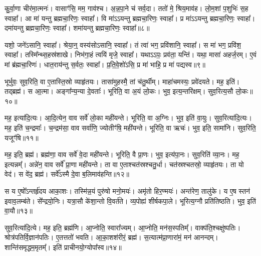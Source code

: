 कु॒र्वा॒णा चीर॑मा॒त्मनः॑। 
वासाꣳ॑सि॒ मम॒ गाव॑श्च। 
अ॒न्न॒पा॒ने च॑ सर्व॒दा। 
ततो॑ मे॒ श्रिय॒माव॑ह। 
लो॒म॒शां प॒शुभिः॑ स॒ह स्वाहा᳚। 
आ मा॑ यन्तु ब्रह्मचा॒रिणः॒ स्वाहा᳚। 
वि मा॑ऽऽयन्तु ब्रह्मचा॒रिणः॒ स्वाहा᳚। 
प्र मा॑ऽऽयन्तु ब्रह्मचा॒रिणः॒ स्वाहा᳚। 
दमा॑यन्तु ब्रह्मचा॒रिणः॒ स्वाहा᳚। 
शमा॑यन्तु ब्रह्मचा॒रिणः॒ स्वाहा᳚॥८॥

यशो॒ जने॑ऽसानि॒ स्वाहा᳚। 
श्रेया॒न्॒ वस्य॑सोऽसानि॒ स्वाहा᳚। 
तं त्वा॑ भग॒ प्रवि॑शानि॒ स्वाहा᳚। 
स मा॑ भग॒ प्रवि॑श॒ स्वाहा᳚। 
तस्मि᳚न्थ्स॒हस्र॑शाखे। 
निभ॑गा॒हं त्वयि॑ मृजे॒ स्वाहा᳚। 
यथाऽऽपः॒ प्रव॑ता॒ यन्ति॑। 
यथा॒ मासा॑ अहर्ज॒रम्। 
ए॒वं मां ब्र॑ह्मचा॒रिणः॑। 
धात॒राय॑न्तु स॒र्वतः॒ स्वाहा᳚। 
प्र॒ति॒वे॒शो॑ऽसि॒ प्र मा॑ भाहि॒ प्र मा॑ पद्यस्व॥९॥
\anuvakamend%

भूर्भुवः॒ सुव॒रिति॒ वा ए॒तास्ति॒स्रो व्याहृ॑तयः। 
तासा॑मुहस्मै॒ तां च॑तु॒र्थीम्। 
माहा॑चमस्यः॒ प्रवे॑दयते। 
मह॒ इति॑। 
तद्ब्रह्म॑। 
स आ॒त्मा। 
अङ्गा᳚न्य॒न्या दे॒वताः᳚। 
भूरिति॒ वा अ॒यं लो॒कः। 
भुव॒ इत्य॒न्तरि॑क्षम्। 
सुव॒रित्य॒सौ लो॒कः॥१०॥

मह॒ इत्या॑दि॒त्यः। 
आ॒दि॒त्येन॒ वाव सर्वे॑ लो॒का मही॑यन्ते। 
भूरिति॒ वा अ॒ग्निः। 
भुव॒ इति॑ वा॒युः। 
सुव॒रित्या॑दि॒त्यः। 
मह॒ इति॑ च॒न्द्रमाः᳚। 
च॒न्द्रम॑सा॒ वाव सर्वा॑णि॒ ज्योतीꣳ॑षि॒ मही॑यन्ते। 
भूरिति॒ वा ऋचः॑। 
भुव॒ इति॒ सामा॑नि। 
सुव॒रिति॒ यजूꣳ॑षि॥११॥

मह॒ इति॒ ब्रह्म॑। 
ब्रह्म॑णा॒ वाव सर्वे॑ वे॒दा मही॑यन्ते। 
भूरिति॒ वै प्रा॒णः। 
भुव॒ इत्य॑पा॒नः। 
सुव॒रिति॑ व्या॒नः। 
मह॒ इत्यन्नम्᳚। 
अन्ने॑न॒ वाव सर्वे᳚ प्रा॒णा मही॑यन्ते। 
ता वा ए॒ताश्चत॑स्रश्चतु॒र्धा। 
चत॑स्रश्चतस्रो॒ व्याहृ॑तयः। 
ता यो वेद॑। 
स वे॑द॒ ब्रह्म॑। 
सर्वे᳚ऽस्मै दे॒वा ब॒लिमाव॑हन्ति॥१२॥
\anuvakamend[अ॒सौ लो॒को यजूꣳ॑षि॒ वेद॒ द्वे च॑]

स य ए॒षो᳚ऽन्तर्\mbox{}हृ॑दय आका॒शः। 
तस्मि॑न्न॒यं पुरु॑षो मनो॒मयः॑। 
अमृ॑तो हिर॒ण्मयः॑। 
अन्त॑रेण॒ तालु॑के। 
य ए॒ष स्तन॑ इवाव॒\-लम्ब॑ते। 
से᳚न्द्रयो॒निः। 
यत्रा॒सौ के॑शा॒न्तो वि॒वर्त॑ते। 
व्य॒पोह्य॑ शीर्\mbox{}षकपा॒ले। 
भूरित्य॒ग्नौ प्रति॑\-तिष्ठति। 
भुव॒ इति॑ वा॒यौ॥१३॥

सुव॒रित्या॑दि॒त्ये। 
मह॒ इति॒ ब्रह्म॑णि। 
आ॒प्नोति॒ स्वारा᳚ज्यम्। 
आ॒प्नोति॒ मन॑स॒स्पतिम्᳚। 
वाक्प॑ति॒श्चक्षु॑ष्पतिः। 
श्रोत्र॑पतिर्वि॒\-ज्ञान॑पतिः। 
ए॒तत्ततो॑ भवति। 
आ॒का॒शश॑रीरं॒ ब्रह्म॑। 
स॒त्यात्म॑प्रा॒णारा॑मं॒ मन॑ आनन्दम्। 
शान्ति॑समृद्धम॒मृतम्᳚। 
इति॑ प्राचीनयो॒ग्योपा᳚स्व॥१४॥
\anuvakamend[वा॒याव॒मृत॒मेकं॑ च]

